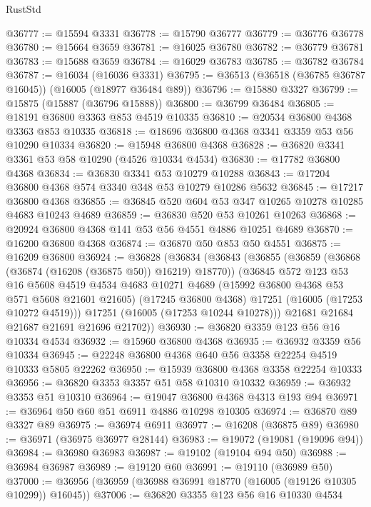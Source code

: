 \begin{lexlean}{RustStd}
\begin{coremodule}
@36777 := @15594 @3331
@36778 := @15790 @36777
@36779 := @36776 @36778
@36780 := @15664 @3659
@36781 := @16025 @36780
@36782 := @36779 @36781
@36783 := @15688 @3659
@36784 := @16029 @36783
@36785 := @36782 @36784
@36787 := @16034 (@16036 @3331)
@36795 := @36513 (@36518 (@36785 @36787 @16045)) (@16005 (@18977 @36484 @89))
@36796 := @15880 @3327
@36799 := @15875 (@15887 (@36796 @15888))
@36800 := @36799 @36484
@36805 := @18191 @36800 @3363 @853 @4519 @10335
@36810 := @20534 @36800 @4368 @3363 @853 @10335
@36818 := @18696 @36800 @4368 @3341 @3359 @53 @56 @10290 @10334
@36820 := @15948 @36800 @4368
@36828 := @36820 @3341 @3361 @53 @58 @10290 (@4526 @10334 @4534)
@36830 := @17782 @36800 @4368
@36834 := @36830 @3341 @53 @10279 @10288
@36843 := @17204 @36800 @4368 @574 @3340 @348 @53 @10279 @10286 @5632
@36845 := @17217 @36800 @4368
@36855 := @36845 @520 @604 @53 @347 @10265 @10278 @10285 @4683 @10243 @4689
@36859 := @36830 @520 @53 @10261 @10263
@36868 := @20924 @36800 @4368 @141 @53 @56 @4551 @4886 @10251 @4689
@36870 := @16200 @36800 @4368
@36874 := @36870 @50 @853 @50 @4551
@36875 := @16209 @36800
@36924 := @36828
    (@36834
      (@36843
        (@36855
          (@36859 (@36868 (@36874 (@16208 (@36875 @50)) @16219) @18770))
          (@36845
            @572
            @123
            @53
            @16
            @5608
            @4519
            @4534
            @4683
            @10271
            @4689
            (@15992 @36800 @4368 @53 @571 @5608 @21601 @21605)
            (@17245 @36800 @4368)
            @17251
            (@16005 (@17253 @10272 @4519)))
          @17251
          (@16005 (@17253 @10244 @10278)))
        @21681
        @21684
        @21687
        @21691
        @21696
        @21702))
@36930 := @36820 @3359 @123 @56 @16 @10334 @4534
@36932 := @15960 @36800 @4368
@36935 := @36932 @3359 @56 @10334
@36945 := @22248 @36800 @4368 @640 @56 @3358 @22254 @4519 @10333 @5805 @22262
@36950 := @15939 @36800 @4368 @3358 @22254 @10333
@36956 := @36820 @3353 @3357 @51 @58 @10310 @10332
@36959 := @36932 @3353 @51 @10310
@36964 := @19047 @36800 @4368 @4313 @193 @94
@36971 := @36964 @50 @60 @51 @6911 @4886 @10298 @10305
@36974 := @36870 @89 @3327 @89
@36975 := @36974 @6911
@36977 := @16208 (@36875 @89)
@36980 := @36971 (@36975 @36977 @28144)
@36983 := @19072 (@19081 (@19096 @94))
@36984 := @36980 @36983
@36987 := @19102 (@19104 @94 @50)
@36988 := @36984 @36987
@36989 := @19120 @60
@36991 := @19110 (@36989 @50)
@37000 := @36956 (@36959 (@36988 @36991 @18770 (@16005 (@19126 @10305 @10299)) @16045))
@37006 := @36820 @3355 @123 @56 @16 @10330 @4534

\end{coremodule}
\end{lexlean}
